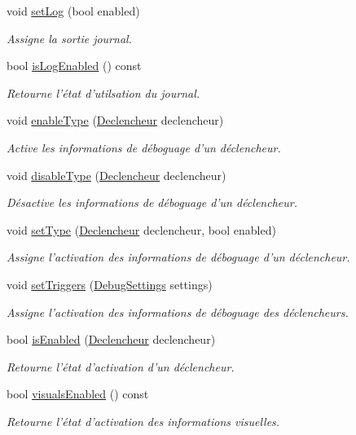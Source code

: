 \begin{DoxyCompactItemize}
void \hyperlink{group__inf2990_gafa37fad6a0a050a913eb0e482f1b0282}{set\-Log} (bool enabled)
\begin{DoxyCompactList}\small\item\em Assigne la sortie journal. \end{DoxyCompactList}\item 
bool \hyperlink{group__inf2990_gae22799c006444ad7f48e7de490b41ef0}{is\-Log\-Enabled} () const 
\begin{DoxyCompactList}\small\item\em Retourne l'état d'utilsation du journal. \end{DoxyCompactList}\item 
void \hyperlink{group__inf2990_ga55375c6c14be967ed7f25eed578a6265}{enable\-Type} (\hyperlink{class_debug_afd6ed3c50c08d0a7830cd5253b4ab8b6}{Declencheur} declencheur)
\begin{DoxyCompactList}\small\item\em Active les informations de déboguage d'un déclencheur. \end{DoxyCompactList}\item 
void \hyperlink{group__inf2990_gaefa863abf2c2b3c6c741b88b3f78e8b3}{disable\-Type} (\hyperlink{class_debug_afd6ed3c50c08d0a7830cd5253b4ab8b6}{Declencheur} declencheur)
\begin{DoxyCompactList}\small\item\em Désactive les informations de déboguage d'un déclencheur. \end{DoxyCompactList}\item 
void \hyperlink{group__inf2990_gaf6b5623dc8f2fdc90abb3648499f3415}{set\-Type} (\hyperlink{class_debug_afd6ed3c50c08d0a7830cd5253b4ab8b6}{Declencheur} declencheur, bool enabled)
\begin{DoxyCompactList}\small\item\em Assigne l'activation des informations de déboguage d'un déclencheur. \end{DoxyCompactList}\item 
void \hyperlink{group__inf2990_gaba1a061318eb0f1819f0c02754b3cb62}{set\-Triggers} (\hyperlink{struct_debug_settings}{Debug\-Settings} settings)
\begin{DoxyCompactList}\small\item\em Assigne l'activation des informations de déboguage des déclencheurs. \end{DoxyCompactList}\item 
bool \hyperlink{group__inf2990_ga63c334cf7a3be794bb8b349c4938613d}{is\-Enabled} (\hyperlink{class_debug_afd6ed3c50c08d0a7830cd5253b4ab8b6}{Declencheur} declencheur)
\begin{DoxyCompactList}\small\item\em Retourne l'état d'activation d'un déclencheur. \end{DoxyCompactList}\item 
bool \hyperlink{group__inf2990_ga15e281e19fa3282487c656ad14d55ee4}{visuals\-Enabled} () const 
\begin{DoxyCompactList}\small\item\em Retourne l'état d'activation des informations visuelles. \end{DoxyCompactList}\end{DoxyCompactItemize}
